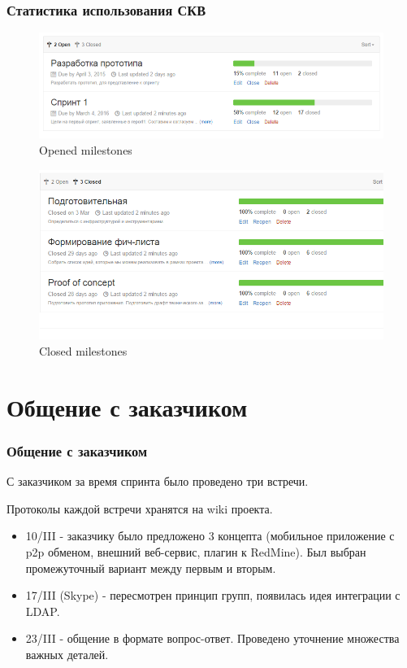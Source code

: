 \documentclass{beamer}
\newlength{\wideitemsep}
\let\olditem\item
\renewcommand{\item}{\setlength{\itemsep}{\wideitemsep}\olditem}
\begin{document}
\begin{frame}
\frametitle{Статистика использования СКВ}

\begin{figure}
\includegraphics[scale=0.3]{res/r2_ms_open}
\caption{Opened milestones}
\end{figure}

\begin{figure}
\includegraphics[scale=0.3]{res/r2_ms_closed}
\caption{Closed milestones}
\end{figure}

\end{frame}


\section{Общение с заказчиком}

\begin{frame}
\frametitle{Общение с заказчиком}

С заказчиком за время спринта было проведено три встречи.

Протоколы каждой встречи хранятся на wiki проекта.

\begin{itemize}
\item 10/III - заказчику было предложено 3 концепта (мобильное приложение с p2p обменом, внешний веб-сервис, плагин к RedMine). Был выбран промежуточный вариант между первым и вторым.
\item 17/III (Skype) - пересмотрен принцип групп, появилась идея интеграции с LDAP.
\item 23/III - общение в формате вопрос-ответ. Проведено уточнение множества важных деталей.
\end{itemize}

\end{frame}
\end{document}
